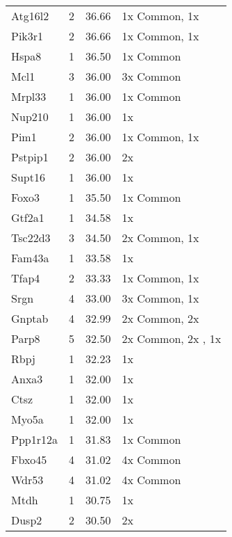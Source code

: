 {\begin{longtable}[l]{lccl}
Atg16l2	&  \num{2}	&  \num{ 36.66}	& 1x Common, 1x  \dnmtwtregular\\ 
Pik3r1	&  \num{2}	&  \num{ 36.66}	& 1x Common, 1x  \dnmtwtregular\\ 
Hspa8	&  \num{1}	&  \num{ 36.50}	& 1x Common\\ 
Mcl1	&  \num{3}	&  \num{ 36.00}	& 3x Common\\ 
Mrpl33	&  \num{1}	&  \num{ 36.00}	& 1x Common\\ 
Nup210	&  \num{1}	&  \num{ 36.00}	& 1x  \dnmtwtregular\\ 
Pim1	&  \num{2}	&  \num{ 36.00}	& 1x Common, 1x  \dnmtchipregular\\ 
Pstpip1	&  \num{2}	&  \num{ 36.00}	& 2x  \dnmtchipregular\\ 
Supt16	&  \num{1}	&  \num{ 36.00}	& 1x  \dnmtchipregular\\ 
Foxo3	&  \num{1}	&  \num{ 35.50}	& 1x Common\\ 
Gtf2a1	&  \num{1}	&  \num{ 34.58}	& 1x  \dnmtchipregular\\ 
Tsc22d3	&  \num{3}	&  \num{ 34.50}	& 2x Common, 1x  \dnmtchipregular\\ 
Fam43a	&  \num{1}	&  \num{ 33.58}	& 1x  \dnmtchipregular\\ 
Tfap4	&  \num{2}	&  \num{ 33.33}	& 1x Common, 1x  \dnmtwtregular\\ 
Srgn	&  \num{4}	&  \num{ 33.00}	& 3x Common, 1x  \dnmtchipregular\\ 
Gnptab	&  \num{4}	&  \num{ 32.99}	& 2x Common, 2x  \dnmtchipregular\\ 
Parp8	&  \num{5}	&  \num{ 32.50}	& 2x Common, 2x  \dnmtchipregular, 1x  \dnmtwtregular\\ 
Rbpj	&  \num{1}	&  \num{ 32.23}	& 1x  \dnmtchipregular\\ 
Anxa3	&  \num{1}	&  \num{ 32.00}	& 1x  \dnmtchipregular\\ 
Ctsz	&  \num{1}	&  \num{ 32.00}	& 1x  \dnmtchipregular\\ 
Myo5a	&  \num{1}	&  \num{ 32.00}	& 1x  \dnmtwtregular\\ 
Ppp1r12a	&  \num{1}	&  \num{ 31.83}	& 1x Common\\ 
Fbxo45	&  \num{4}	&  \num{ 31.02}	& 4x Common\\ 
Wdr53	&  \num{4}	&  \num{ 31.02}	& 4x Common\\ 
Mtdh	&  \num{1}	&  \num{ 30.75}	& 1x  \dnmtchipregular\\ 
Dusp2	&  \num{2}	&  \num{ 30.50}	& 2x  \dnmtchipregular\\ 

\end{longtable}}
